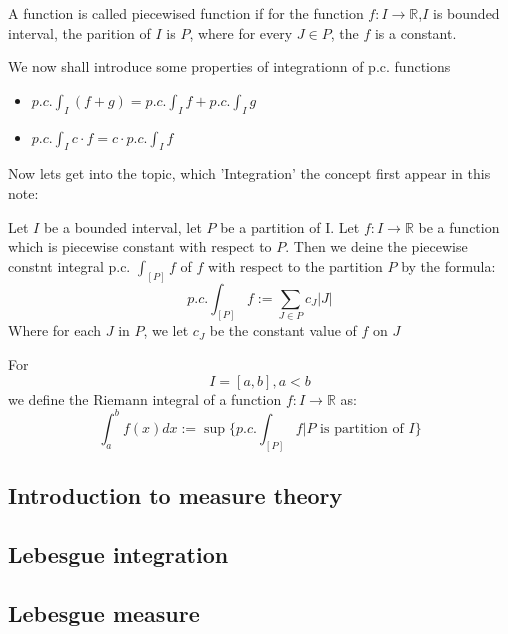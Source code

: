 \documentclass{article}
\newcommand{\R}{\mathbb{R}}
\begin{document}
\begin{definition}
	A function is called piecewised function if for the function $f:I\to \R$,$I$ is bounded interval, the parition of $I$ is $P$, where for every $J\in P$, the $f$ is a constant. 
\end{definition}

\begin{theorem}
  We now shall introduce some properties of integrationn of p.c. functions
  \begin{itemize}
    \item $p.c.\int_I(f+g)=p.c.\int_I f+p.c.\int_I g$
    \item $p.c.\int_I c\cdot f=c\cdot p.c.\int_I f$

  \end{itemize}
  
\end{theorem}

Now lets get into the topic, which 'Integration' the concept first appear in this note:
\begin{definition}
	Let $I$ be a bounded interval, let $P$ be a partition of I. Let $f:I\to \R$ be a function which is piecewise constant with respect to $P$. Then we deine the piecewise constnt integral p.c. $\int_{[P]}f$ of $f$ with respect to the partition $P$ by the formula:
	\begin{equation*}
		p.c.\int_{[P]}f:=\sum_{J\in P}c_J|J|
	\end{equation*}
	Where for each $J$ in $P$, we let $c_J$ be the constant value of $f$ on $J$
\end{definition}


\begin{definition}
  For $$I=[a,b], a<b$$ we define the Riemann integral of a function $f:I\to \R$ as:
  \begin{equation}
    \int_a^b f(x)dx:=\sup\{p.c.\int_{[P]}f|P \text{ is partition of } I\} 
  \end{equation}
\end{definition}




\subsection{Introduction to measure theory}
\subsection{Lebesgue integration}
\subsection{Lebesgue measure}
\end{document}
